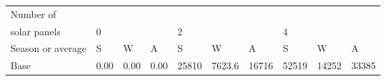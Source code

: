 \begin{table}[h] 
\centering 
\begin{tabular}{l|lll|lll|lll}Number of \\ solar panels&0& & &2& & &4& & \\ \hline 
Season or average & S & W & A & S & W & A & S & W & A \\ \hline 
Base&0.00&0.00&0.00&25810&7623.6&16716&52519&14252&33385 \\ 
\end{tabular} 
\end{table}